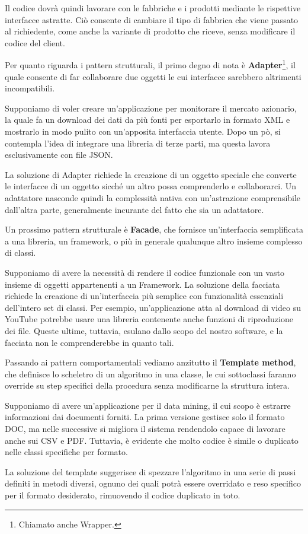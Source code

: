 \noindent Il codice dovrà quindi lavorare con le fabbriche e i prodotti mediante le rispettive interfacce astratte. Ciò consente di cambiare il tipo di
fabbrica che viene passato al richiedente, come anche la variante di prodotto che riceve, senza modificare il codice del client.\newline

\noindent Per quanto riguarda i pattern strutturali, il primo degno di nota è \textbf{Adapter}\footnote{Chiamato anche Wrapper.}, il quale consente di
far collaborare due oggetti le cui interfacce sarebbero altrimenti incompatibili.\par
Supponiamo di voler creare un'applicazione per monitorare il mercato azionario, la quale fa un download dei dati da più fonti per esportarlo in formato
XML e mostrarlo in modo pulito con un'apposita interfaccia utente. Dopo un pò, si contempla l'idea di integrare una libreria di terze parti, ma questa
lavora esclusivamente con file JSON.\par
La soluzione di Adapter richiede la creazione di un oggetto speciale che converte le interfacce di un oggetto sicché un altro possa comprenderlo e
collaborarci. Un adattatore nasconde quindi la complessità nativa con un'astrazione comprensibile dall'altra parte, generalmente incurante del fatto
che sia un adattatore.\newline

\noindent Un prossimo pattern strutturale è \textbf{Facade}, che fornisce un'interfaccia semplificata a una libreria, un framework, o più in generale
qualunque altro insieme complesso di classi.\par
Supponiamo di avere la necessità di rendere il codice funzionale con un vasto insieme di oggetti appartenenti a un Framework. La soluzione della
facciata richiede la creazione di un'interfaccia più semplice con funzionalità essenziali dell'intero set di classi. Per esempio, un'applicazione atta
al download di video su YouTube potrebbe usare una libreria contenente anche funzioni di riproduzione dei file. Queste ultime, tuttavia, esulano dallo
scopo del nostro software, e la facciata non le comprenderebbe in quanto tali.\newline

\noindent Passando ai pattern comportamentali vediamo anzitutto il \textbf{Template method}, che definisce lo scheletro di un algoritmo in una classe,
le cui sottoclassi faranno override su step specifici della procedura senza modificarne la struttura intera.\par
Supponiamo di avere un'applicazione per il data mining, il cui scopo è estrarre informazioni dai documenti forniti. La prima versione gestisce solo il
formato DOC, ma nelle successive si migliora il sistema rendendolo capace di lavorare anche sui CSV e PDF. Tuttavia, è evidente che molto codice è
simile o duplicato nelle classi specifiche per formato.\par
La soluzione del template suggerisce di spezzare l'algoritmo in una serie di passi definiti in metodi diversi, ognuno dei quali potrà essere overridato
e reso specifico per il formato desiderato, rimuovendo il codice duplicato in toto.\newline


